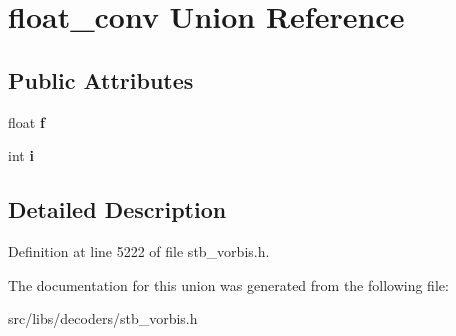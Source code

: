 \hypertarget{unionfloat__conv}{\section{float\-\_\-conv Union Reference}
\label{unionfloat__conv}
}
\subsection*{Public Attributes}
\begin{DoxyCompactItemize}
\item 
\hypertarget{unionfloat__conv_a500605cabc18ae27268bcd0af4276c16}{float {\bfseries f}}\label{unionfloat__conv_a500605cabc18ae27268bcd0af4276c16}

\item 
\hypertarget{unionfloat__conv_a9e1033bdaee2009f7d6ba9f529da0f8b}{int {\bfseries i}}\label{unionfloat__conv_a9e1033bdaee2009f7d6ba9f529da0f8b}

\end{DoxyCompactItemize}


\subsection{Detailed Description}


Definition at line 5222 of file stb\-\_\-vorbis.\-h.



The documentation for this union was generated from the following file\-:\begin{DoxyCompactItemize}
\item 
src/libs/decoders/stb\-\_\-vorbis.\-h\end{DoxyCompactItemize}
